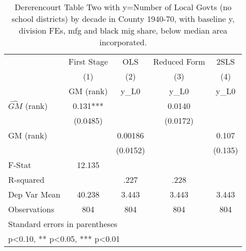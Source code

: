 \begin{table}[htbp]\centering
\def\sym#1{\ifmmode^{#1}\else\(^{#1}\)\fi}
\caption{Dererencourt Table Two with y=Number of Local Govts (no school districts) by decade in County 1940-70, with baseline y, division FEs, mfg and black mig share, below median area incorporated.}
\begin{tabular}{l*{4}{c}}
\toprule
                    & First Stage   &         OLS   &Reduced Form   &        2SLS   \\
                    &\multicolumn{1}{c}{(1)}&\multicolumn{1}{c}{(2)}&\multicolumn{1}{c}{(3)}&\multicolumn{1}{c}{(4)}\\
                    &\multicolumn{1}{c}{GM  (rank)}&\multicolumn{1}{c}{y\_L0}&\multicolumn{1}{c}{y\_L0}&\multicolumn{1}{c}{y\_L0}\\
\midrule
$\hat{GM}$ (rank)   &       0.131***&               &      0.0140   &               \\
                    &    (0.0485)   &               &    (0.0172)   &               \\
\addlinespace
GM  (rank)          &               &     0.00186   &               &       0.107   \\
                    &               &    (0.0152)   &               &     (0.135)   \\
\midrule
F-Stat              &      12.135   &               &               &               \\
R-squared           &               &        .227   &        .228   &               \\
Dep Var Mean        &      40.238   &       3.443   &       3.443   &       3.443   \\
Observations        &         804   &         804   &         804   &         804   \\
\bottomrule
\multicolumn{5}{l}{\footnotesize Standard errors in parentheses}\\
\multicolumn{5}{l}{\footnotesize * p<0.10, ** p<0.05, *** p<0.01}\\
\end{tabular}
\end{table}
